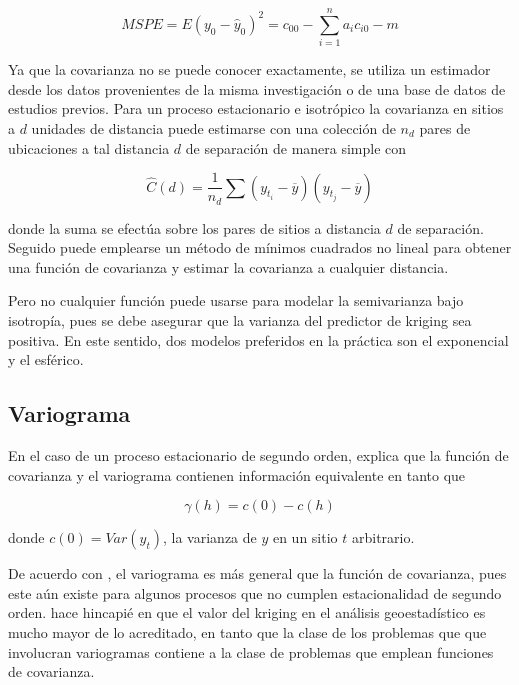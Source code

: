 \documentclass[14pt]{extarticle}
\begin{document}
\begin{equation}
	MSPE = E\left(y_0 - \hat{y}_0\right)^2 = c_{00} - \sum_{i=1}^{n}a_i c_{i0} - m\label{MSPE_kriging}
\end{equation} 

Ya que la covarianza no se puede conocer exactamente, se utiliza un estimador desde los datos provenientes de la misma investigación o de una base de datos de estudios previos\cite{Thompson.2012}. Para un proceso estacionario e isotrópico la covarianza en sitios a $d$ unidades de distancia puede estimarse con una colección de $n_d$ pares de ubicaciones a tal distancia $d$ de separación de manera simple con

\begin{equation}
	\hat{C}(d) = \frac{1}{n_d} \sum \left(y_{t_i} - \overline{y}\right) \left(y_{t_j} - \overline{y}\right)\label{estimador_covarianza}
\end{equation}

\noindent donde la suma se efectúa sobre los pares de sitios a distancia $d$ de separación. Seguido puede emplearse un método de mínimos cuadrados no lineal para obtener una función de covarianza y estimar la covarianza a cualquier distancia\cite{Thompson.2012}. 

Pero no cualquier función puede usarse para modelar la semivarianza bajo isotropía, pues se debe asegurar que la varianza del predictor de kriging sea positiva\cite{Brus.2022}. En este sentido, dos modelos preferidos en la práctica son el exponencial y el esférico. 

\subsection{Variograma}
En el caso de un proceso estacionario de segundo orden, \cite{Thompson.2012} explica que la función de covarianza y el variograma contienen información equivalente en tanto que 

\begin{equation}
	\gamma (h) = c(0) - c(h) \label{semivariograma_segundo_orden}
\end{equation}

\noindent donde $c(0) = Var(y_t)$, la varianza de $y$ en un sitio $t$ arbitrario. 

De acuerdo con \cite{Cressie.1986}, el variograma es más general que la función de covarianza, pues este aún existe para algunos procesos que no cumplen estacionalidad de segundo orden. \cite{Cressie.1989} hace hincapié en que el valor del kriging en el análisis geoestadístico es mucho mayor de lo acreditado, en tanto que la clase de los problemas que que involucran variogramas contiene a la clase de problemas que emplean funciones de covarianza.
\end{document}
